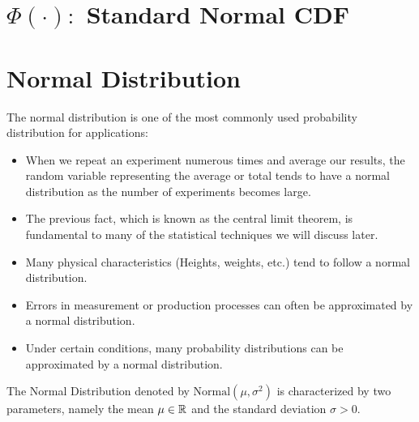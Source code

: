 \documentclass[compress]{beamer}
\begin{document}


\section{$\Phi(\cdot):  $ Standard Normal CDF}




\section{Normal Distribution}


\begin{frame}
The normal distribution is one of the most commonly used probability distribution for applications:
\begin{itemize}
\item  When we repeat an experiment numerous times and average our results, the random variable representing the average or total tends to have a normal distribution as the number of experiments becomes large.
\item   The previous fact, which is known as the central limit theorem, is fundamental to many of the statistical techniques we will discuss later.
\item  Many physical characteristics (Heights, weights, etc.) tend to follow a normal distribution.
\item  Errors in measurement or production processes can often be
approximated by a normal distribution.
\item Under certain conditions, many probability distributions can be
approximated by a normal distribution.
\end{itemize}
\end{frame}



\begin{frame}
The Normal Distribution denoted by $\text{Normal}(\mu, \sigma^2)$ is characterized by two parameters, namely the mean $\mu\in \mathbb{R}$ and the standard deviation $\sigma>0$.


\end{frame}
\end{document}
